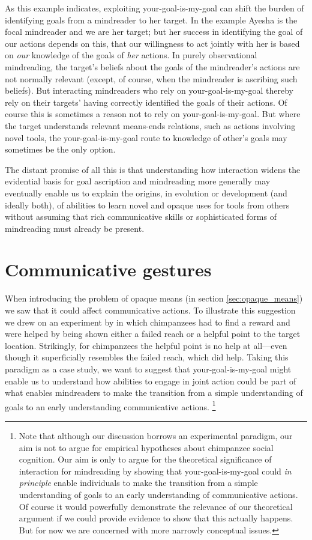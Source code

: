 \documentclass[14pt,a4paper]{extarticle}
\begin{document}
As this example indicates,
exploiting your-goal-is-my-goal 
can shift the burden of identifying goals from a mindreader to her target.
In the example Ayesha is the focal mindreader and we are her target;
but her success in identifying the goal of our actions
depends on this,
that our willingness to act jointly with her is based on \emph{our} knowledge of the goals of \emph{her} actions.
In purely observational mindreading, the target's beliefs about the goals of the mindreader's actions are not normally relevant (except, of course, when the mindreader is ascribing such beliefs).
But interacting mindreaders who rely on your-goal-is-my-goal
thereby rely on their targets' having correctly identified the goals of their actions.
Of course this is sometimes a reason not to rely on your-goal-is-my-goal.
But where the target understands relevant means-ends relations,
such as actions involving novel tools,
the your-goal-is-my-goal route to knowledge of other's goals may sometimes be the only option.

The distant promise of all this is that 
understanding how interaction widens the evidential basis for goal ascription and mindreading more generally 
may eventually enable us to explain
the origins, in evolution or development (and ideally both), of abilities to learn novel and opaque uses for tools from others 
without assuming that 
rich communicative skills
or 
sophisticated forms of mindreading 
must already be  present.


\section{Communicative gestures}
\label{sec:communicative_gestures}
When introducing the problem of opaque means 
(in section \vref{sec:opaque_means})
we saw that it could  affect
communicative actions.
To illustrate this suggestion we drew on 
an experiment by \citet{hare_chimpanzees_2004}
in which chimpanzees had to find a reward 
and were helped by being shown either a failed reach or  a helpful point to the target location.
Strikingly, for chimpanzees the helpful point is no help at all---even though it superficially resembles the failed reach, which  did help.
Taking this paradigm as a case study, 
we want to suggest that your-goal-is-my-goal might 
enable us to understand how abilities to engage in joint action 
could be part of what enables mindreaders to make the transition from 
a simple understanding of goals 
to 
an early understanding communicative actions.%
\footnote{
Note that although our discussion borrows an experimental paradigm,
our aim is not to argue for empirical hypotheses about chimpanzee social cognition.
Our aim is only to argue for the theoretical significance of interaction for mindreading by showing 
that your-goal-is-my-goal
could \emph{in principle} enable
individuals to make the transition 
from
 a simple understanding of goals
to
 an early understanding of communicative actions.
Of course it would powerfully demonstrate the relevance of our theoretical argument if we could provide evidence to show that this actually happens.
But for now we are concerned with more narrowly conceptual issues.
}
\end{document}
